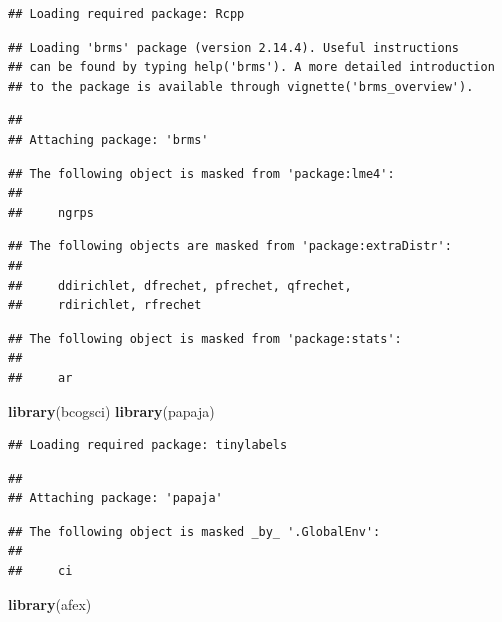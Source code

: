 \documentclass[12pt,]{krantz}
\newenvironment{Shaded}{\begin{snugshade}}{\end{snugshade}}
\newcommand{\KeywordTok}[1]{\textcolor[rgb]{0.13,0.29,0.53}{\textbf{#1}}}
\newcommand{\NormalTok}[1]{#1}
\begin{document}
\begin{verbatim}
## Loading required package: Rcpp
\end{verbatim}

\begin{verbatim}
## Loading 'brms' package (version 2.14.4). Useful instructions
## can be found by typing help('brms'). A more detailed introduction
## to the package is available through vignette('brms_overview').
\end{verbatim}

\begin{verbatim}
## 
## Attaching package: 'brms'
\end{verbatim}

\begin{verbatim}
## The following object is masked from 'package:lme4':
## 
##     ngrps
\end{verbatim}

\begin{verbatim}
## The following objects are masked from 'package:extraDistr':
## 
##     ddirichlet, dfrechet, pfrechet, qfrechet,
##     rdirichlet, rfrechet
\end{verbatim}

\begin{verbatim}
## The following object is masked from 'package:stats':
## 
##     ar
\end{verbatim}

\begin{Shaded}
\begin{Highlighting}[]
\KeywordTok{library}\NormalTok{(bcogsci)}
\KeywordTok{library}\NormalTok{(papaja)}
\end{Highlighting}
\end{Shaded}

\begin{verbatim}
## Loading required package: tinylabels
\end{verbatim}

\begin{verbatim}
## 
## Attaching package: 'papaja'
\end{verbatim}

\begin{verbatim}
## The following object is masked _by_ '.GlobalEnv':
## 
##     ci
\end{verbatim}

\begin{Shaded}
\begin{Highlighting}[]
\KeywordTok{library}\NormalTok{(afex)}
\end{Highlighting}
\end{Shaded}
\end{document}
